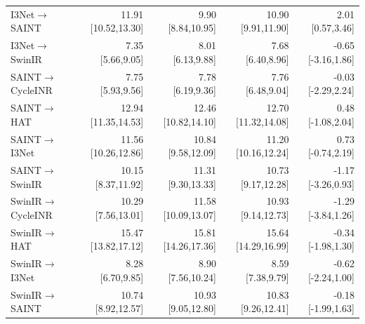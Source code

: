 \begin{table}[t]
\begin{tabular}{lrrrr}
I3Net$\to$SAINT & 11.91 [10.52,13.30] & 9.90 [8.84,10.95] & 10.90 [9.91,11.90] & 2.01 [0.57,3.46] \\
I3Net$\to$SwinIR & 7.35 [5.66,9.05] & 8.01 [6.13,9.88] & 7.68 [6.40,8.96] & -0.65 [-3.16,1.86] \\
SAINT$\to$CycleINR & 7.75 [5.93,9.56] & 7.78 [6.19,9.36] & 7.76 [6.48,9.04] & -0.03 [-2.29,2.24] \\
SAINT$\to$HAT & 12.94 [11.35,14.53] & 12.46 [10.82,14.10] & 12.70 [11.32,14.08] & 0.48 [-1.08,2.04] \\
SAINT$\to$I3Net & 11.56 [10.26,12.86] & 10.84 [9.58,12.09] & 11.20 [10.16,12.24] & 0.73 [-0.74,2.19] \\
SAINT$\to$SwinIR & 10.15 [8.37,11.92] & 11.31 [9.30,13.33] & 10.73 [9.17,12.28] & -1.17 [-3.26,0.93] \\
SwinIR$\to$CycleINR & 10.29 [7.56,13.01] & 11.58 [10.09,13.07] & 10.93 [9.14,12.73] & -1.29 [-3.84,1.26] \\
SwinIR$\to$HAT & 15.47 [13.82,17.12] & 15.81 [14.26,17.36] & 15.64 [14.29,16.99] & -0.34 [-1.98,1.30] \\
SwinIR$\to$I3Net & 8.28 [6.70,9.85] & 8.90 [7.56,10.24] & 8.59 [7.38,9.79] & -0.62 [-2.24,1.00] \\
SwinIR$\to$SAINT & 10.74 [8.92,12.57] & 10.93 [9.05,12.80] & 10.83 [9.26,12.41] & -0.18 [-1.99,1.63] \\\bottomrule\end{tabular}\end{table}
